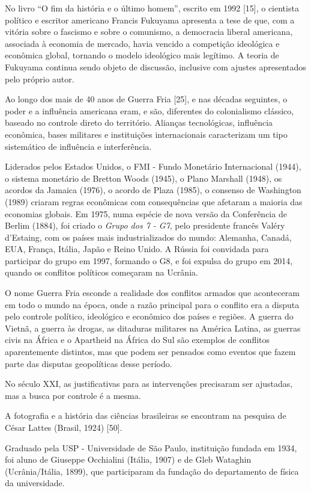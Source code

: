 \documentclass{hipatia}
\begin{document}
No livro ``O fim da história e o último homem'', escrito em 1992 [15], o cientista político e escritor americano Francis Fukuyama apresenta a tese de que, com a vitória sobre o fascismo e sobre o comunismo, a democracia liberal americana, associada à economia de mercado, havia vencido a competição ideológica e econômica global, tornando o modelo ideológico mais legítimo. A teoria de Fukuyama continua sendo objeto de discussão, inclusive com ajustes apresentados pelo próprio autor.

Ao longo dos mais de 40 anos de Guerra Fria 	[25], e nas décadas seguintes, o poder e a influência americana eram, e são, diferentes do colonialismo clássico, baseado no controle direto do território. Alianças tecnológicas, influência econômica, bases militares e instituições internacionais caracterizam um tipo sistemático de influência e interferência.

Liderados pelos Estados Unidos, o FMI - Fundo Monetário Internacional (1944), o sistema monetário de Bretton Woods (1945), o Plano Marshall (1948), os acordos da Jamaica (1976), o acordo de Plaza (1985), o consenso de Washington (1989) criaram regras econômicas com consequências que afetaram a maioria das economias globais. Em 1975, numa espécie de nova versão da Conferência de Berlim (1884), foi criado o \textit{Grupo dos 7 - G7}, pelo presidente francês Valéry d’Estaing, com os países mais industrializados do mundo: Alemanha, Canadá, EUA, França, Itália, Japão e Reino Unido. A Rússia foi convidada para participar do grupo em 1997, formando o G8, e foi expulsa do grupo em 2014, quando os conflitos políticos começaram na Ucrânia.

O nome Guerra Fria esconde a realidade dos conflitos armados que aconteceram em todo o mundo na época, onde a razão principal para o conflito era a disputa pelo controle político, ideológico e econômico dos países e regiões. A guerra do Vietnã, a guerra às drogas, as ditaduras militares na América Latina, as guerras civis na África e o Apartheid na África do Sul são exemplos de conflitos aparentemente distintos, mas que podem ser pensados como eventos que fazem parte das disputas geopolíticas desse período.

No século XXI, as justificativas para as intervenções precisaram ser ajustadas, mas a busca por controle é a mesma.

A fotografia e a história das ciências brasileiras se encontram na pesquisa de César Lattes (Brasil, 1924) 	[50].

Graduado pela USP - Universidade de São Paulo, instituição fundada em 1934, foi aluno de Giuseppe Occhialini (Itália, 1907) e de Gleb Wataghin (Ucrânia/Itália, 1899), que participaram da fundação do departamento de física da universidade.
\end{document}
